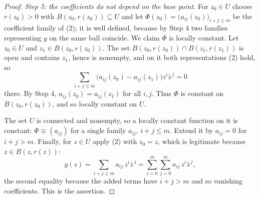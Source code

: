 \begin{proof}
\emph{Step 5: the coefficients do not depend on the base point.}  For $z_0\in U$
choose $r(z_0)>0$ with $B(z_0,r(z_0))\subseteq U$ and let
$\Phi(z_0)=\bigl(a_{ij}(z_0)\bigr)_{i+j\le m}$ be the coefficient family of (2);
it is well defined, because by Step 4 two families representing $g$ on the same
ball coincide.  We claim $\Phi$ is locally constant.  Let $z_0\in U$ and
$z_1\in B(z_0,r(z_0))$.  The set
$B(z_0,r(z_0))\cap B(z_1,r(z_1))$ is open and contains $z_1$, hence is
nonempty, and on it both representations (2) hold, so
\[
  \sum_{i+j\le m}\bigl(a_{ij}(z_0)-a_{ij}(z_1)\bigr)z^i\bar z^{\,j}=0
\]
there.  By Step 4, $a_{ij}(z_0)=a_{ij}(z_1)$ for all $i,j$.  Thus $\Phi$ is
constant on $B(z_0,r(z_0))$, and so locally constant on $U$.

The set $U$ is connected and nonempty, so a locally constant function on it is
constant: $\Phi\equiv(a_{ij})$ for a single family $a_{ij}$, $i+j\le m$.
Extend it by $a_{ij}=0$ for $i+j>m$.  Finally, for $z\in U$ apply (2) with
$z_0=z$, which is legitimate because $z\in B(z,r(z))$:
\[
  g(z)=\sum_{i+j\le m}a_{ij}\,z^i\bar z^{\,j}
      =\sum_{i=0}^{m}\sum_{j=0}^{m}a_{ij}\,z^i\bar z^{\,j},
\]
the second equality because the added terms have $i+j>m$ and so vanishing
coefficients.  This is the assertion.
\end{proof}
